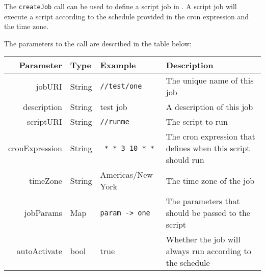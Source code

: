 The \verb+createJob+ call can be used to define a script job in \Rapture. A script job will execute
a \Reflex script according to the schedule provided in the cron expression and the time zone.

The parameters to the call are described in the table below:

\begin{table}[H]
\begin{center}
\begin{tabular}{r l l p{4cm}}
  Parameter & Type & Example & Description \\
  \hline
  jobURI & String & \verb+//test/one+ & The unique name of this job \\
  description & String & test job & A description of this job \\
  scriptURI & String & \verb+//runme+ & The script to run \\
  cronExpression & String & \verb+ * * 3 10 * *+ & The cron expression that defines when this script should run \\
  timeZone & String & Americas/New York & The time zone of the job \\
  jobParams & Map & \verb+param -> one+ & The parameters that should be passed to the script \\
  autoActivate & bool & true & Whether the job will always run according to the schedule \\
\end{tabular}
\end{center}
\end{table}
